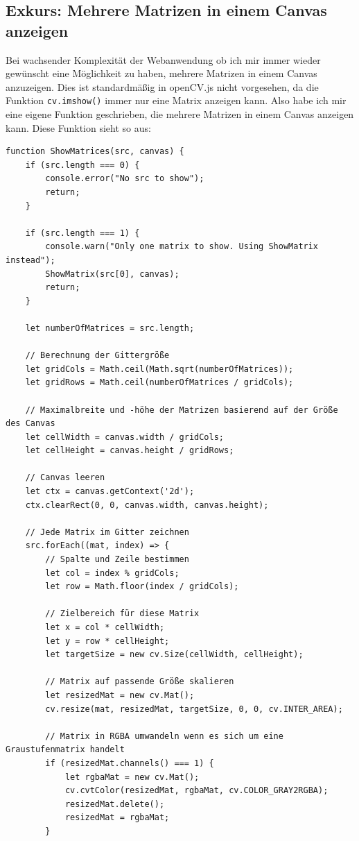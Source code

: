 \subsection{Exkurs: Mehrere Matrizen in einem Canvas anzeigen}
Bei wachsender Komplexität der Webanwendung ob ich mir immer wieder gewünscht eine Möglichkeit zu haben, mehrere Matrizen in einem Canvas anzuzeigen. Dies ist standardmäßig in openCV.js nicht vorgesehen, da die Funktion \texttt{cv.imshow()} immer nur eine Matrix anzeigen kann. Also habe ich mir eine eigene Funktion geschrieben, die mehrere Matrizen in einem Canvas anzeigen kann. Diese Funktion sieht so aus:

\begin{lstlisting}[style=JavaScript]
function ShowMatrices(src, canvas) {
    if (src.length === 0) {
        console.error("No src to show");
        return;
    }

    if (src.length === 1) {
        console.warn("Only one matrix to show. Using ShowMatrix instead");
        ShowMatrix(src[0], canvas);
        return;
    }

    let numberOfMatrices = src.length;

    // Berechnung der Gittergröße
    let gridCols = Math.ceil(Math.sqrt(numberOfMatrices));
    let gridRows = Math.ceil(numberOfMatrices / gridCols);

    // Maximalbreite und -höhe der Matrizen basierend auf der Größe des Canvas
    let cellWidth = canvas.width / gridCols;
    let cellHeight = canvas.height / gridRows;

    // Canvas leeren
    let ctx = canvas.getContext('2d');
    ctx.clearRect(0, 0, canvas.width, canvas.height);

    // Jede Matrix im Gitter zeichnen
    src.forEach((mat, index) => {
        // Spalte und Zeile bestimmen
        let col = index % gridCols;
        let row = Math.floor(index / gridCols);

        // Zielbereich für diese Matrix
        let x = col * cellWidth;
        let y = row * cellHeight;
        let targetSize = new cv.Size(cellWidth, cellHeight);

        // Matrix auf passende Größe skalieren
        let resizedMat = new cv.Mat();
        cv.resize(mat, resizedMat, targetSize, 0, 0, cv.INTER_AREA);

        // Matrix in RGBA umwandeln wenn es sich um eine Graustufenmatrix handelt
        if (resizedMat.channels() === 1) {
            let rgbaMat = new cv.Mat();
            cv.cvtColor(resizedMat, rgbaMat, cv.COLOR_GRAY2RGBA);
            resizedMat.delete();
            resizedMat = rgbaMat;
        }


\end{lstlisting}
